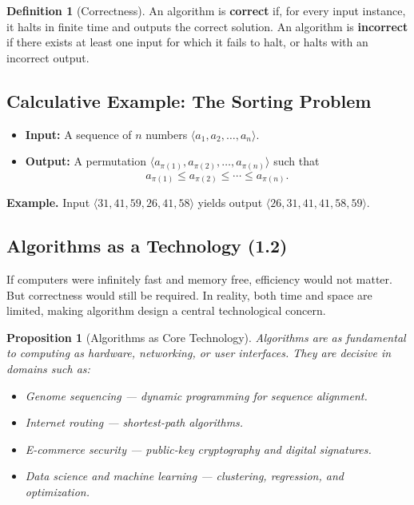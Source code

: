 \documentclass[12pt]{article}
\newtheorem{proposition}[theorem]{Proposition}
\theoremstyle{definition}
\newtheorem{definition}{Definition}
\begin{document}
\begin{definition}[Correctness]
An algorithm is \textbf{correct} if, for every input instance, it halts in finite time 
and outputs the correct solution. An algorithm is \textbf{incorrect} if there exists 
at least one input for which it fails to halt, or halts with an incorrect output.
\end{definition}

\subsection*{Calculative Example: The Sorting Problem}
\begin{itemize}
    \item \textbf{Input:} A sequence of $n$ numbers $\langle a_1, a_2, \dots, a_n \rangle$.
    \item \textbf{Output:} A permutation $\langle a_{\pi(1)}, a_{\pi(2)}, \dots, a_{\pi(n)} \rangle$ 
    such that 
    \[
        a_{\pi(1)} \leq a_{\pi(2)} \leq \cdots \leq a_{\pi(n)}.
    \]
\end{itemize}

\textbf{Example.} Input $\langle 31, 41, 59, 26, 41, 58 \rangle$ yields output 
$\langle 26, 31, 41, 41, 58, 59 \rangle$.

\subsection*{Algorithms as a Technology (1.2)}

If computers were infinitely fast and memory free, efficiency would not matter. 
But correctness would still be required. In reality, both time and space are 
limited, making algorithm design a central technological concern.

\begin{proposition}[Algorithms as Core Technology]
Algorithms are as fundamental to computing as hardware, networking, or 
user interfaces. They are decisive in domains such as:
\begin{itemize}
    \item \emph{Genome sequencing} --- dynamic programming for sequence alignment.
    \item \emph{Internet routing} --- shortest-path algorithms.
    \item \emph{E-commerce security} --- public-key cryptography and digital signatures.
    \item \emph{Data science and machine learning} --- clustering, regression, and optimization.
\end{itemize}
\end{proposition}
\end{document}

